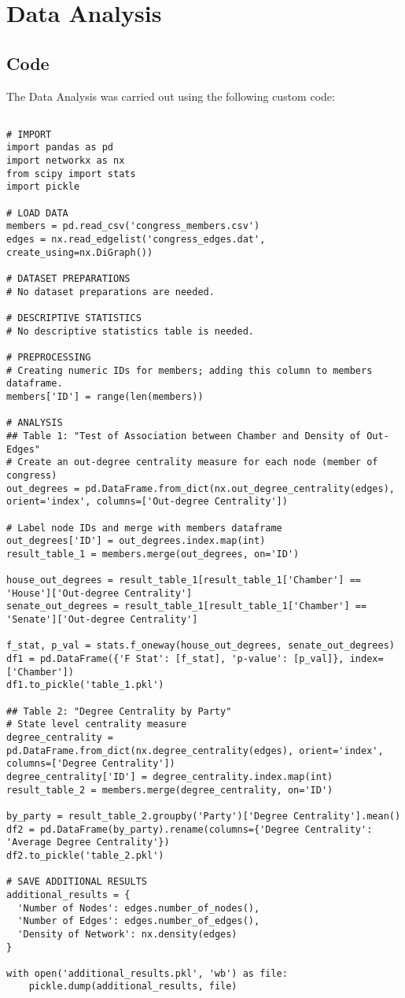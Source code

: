 \documentclass[11pt]{article}
\begin{document}
\section{Data Analysis}
\subsection{{Code}}
The Data Analysis was carried out using the following custom code:

\begin{verbatim}

# IMPORT
import pandas as pd
import networkx as nx
from scipy import stats
import pickle

# LOAD DATA
members = pd.read_csv('congress_members.csv')
edges = nx.read_edgelist('congress_edges.dat', create_using=nx.DiGraph())

# DATASET PREPARATIONS
# No dataset preparations are needed.

# DESCRIPTIVE STATISTICS
# No descriptive statistics table is needed.

# PREPROCESSING
# Creating numeric IDs for members; adding this column to members dataframe.
members['ID'] = range(len(members))

# ANALYSIS
## Table 1: "Test of Association between Chamber and Density of Out-Edges"
# Create an out-degree centrality measure for each node (member of congress)
out_degrees = pd.DataFrame.from_dict(nx.out_degree_centrality(edges), orient='index', columns=['Out-degree Centrality'])

# Label node IDs and merge with members dataframe
out_degrees['ID'] = out_degrees.index.map(int)
result_table_1 = members.merge(out_degrees, on='ID')

house_out_degrees = result_table_1[result_table_1['Chamber'] == 'House']['Out-degree Centrality']
senate_out_degrees = result_table_1[result_table_1['Chamber'] == 'Senate']['Out-degree Centrality']

f_stat, p_val = stats.f_oneway(house_out_degrees, senate_out_degrees)
df1 = pd.DataFrame({'F Stat': [f_stat], 'p-value': [p_val]}, index=['Chamber'])
df1.to_pickle('table_1.pkl')

## Table 2: "Degree Centrality by Party"
# State level centrality measure
degree_centrality = pd.DataFrame.from_dict(nx.degree_centrality(edges), orient='index', columns=['Degree Centrality'])
degree_centrality['ID'] = degree_centrality.index.map(int)
result_table_2 = members.merge(degree_centrality, on='ID')

by_party = result_table_2.groupby('Party')['Degree Centrality'].mean()
df2 = pd.DataFrame(by_party).rename(columns={'Degree Centrality': 'Average Degree Centrality'})
df2.to_pickle('table_2.pkl')

# SAVE ADDITIONAL RESULTS
additional_results = { 
  'Number of Nodes': edges.number_of_nodes(), 
  'Number of Edges': edges.number_of_edges(), 
  'Density of Network': nx.density(edges)
} 

with open('additional_results.pkl', 'wb') as file:
    pickle.dump(additional_results, file)

\end{verbatim}
\end{document}
